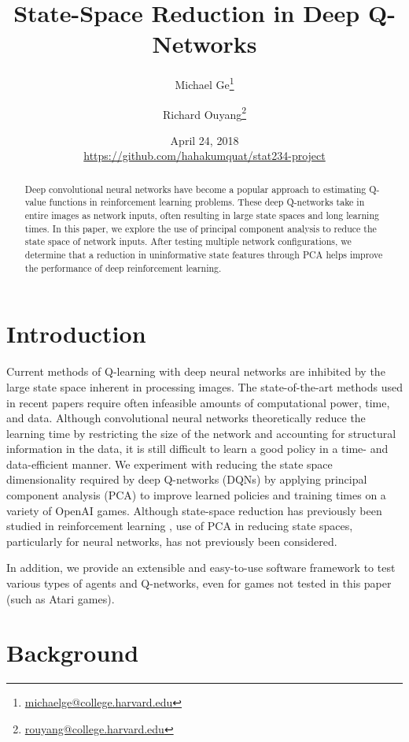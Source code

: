 \documentclass[11pt]{article}
\title{State-Space Reduction in Deep Q-Networks}
\author{Michael Ge\thanks{\url{michaelge@college.harvard.edu}} 
        \and 
        Richard Ouyang\thanks{\url{rouyang@college.harvard.edu}}}
\date{April 24, 2018 \\
      \small{\url{https://github.com/hahakumquat/stat234-project}}}
\begin{document}
\maketitle

\listoftodos

\begin{abstract}
Deep convolutional neural networks have become a popular approach to estimating Q-value functions in reinforcement learning problems. These deep Q-networks take in entire images as network inputs, often resulting in large state spaces and long learning times. In this paper, we explore the use of principal component analysis to reduce the state space of network inputs. After testing multiple network configurations, we determine that a reduction in uninformative state features through PCA helps improve the performance of deep reinforcement learning.
\end{abstract}
\newpage
\tableofcontents

\twocolumn
\newpage

\section{Introduction}

Current methods of Q-learning with deep neural networks are inhibited by the large state space inherent in processing images. The state-of-the-art methods used in recent papers \cite{mnih2013playing, mnih2015human, van2016deep} require often infeasible amounts of computational power, time, and data. Although convolutional neural networks theoretically reduce the learning time by restricting the size of the network and accounting for structural information in the data, it is still difficult to learn a good policy in a time- and data-efficient manner. We experiment with reducing the state space dimensionality required by deep Q-networks (DQNs) by applying principal component analysis (PCA) to improve learned policies and training times on a variety of OpenAI games. Although state-space reduction has previously been studied in reinforcement learning \cite{kishima2013reduction}, use of PCA in reducing state spaces, particularly for neural networks, has not previously been considered. 

In addition, we provide an extensible and easy-to-use software framework to test various types of agents and Q-networks, even for games not tested in this paper (such as Atari games).

\section{Background}
\end{document}
